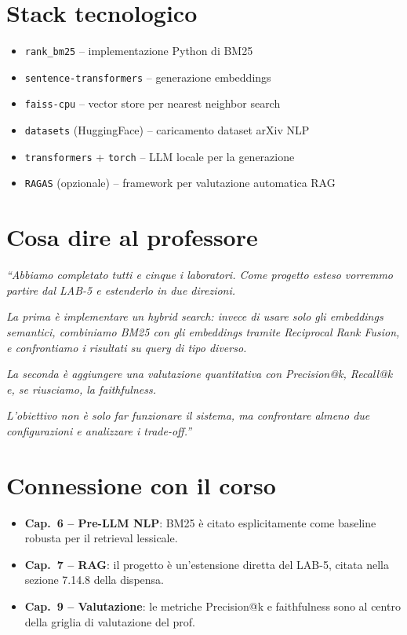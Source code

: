 \documentclass[12pt,a4paper]{article}
\begin{document}
\section{Stack tecnologico}

\begin{itemize}
  \item \texttt{rank\_bm25} -- implementazione Python di BM25
  \item \texttt{sentence-transformers} -- generazione embeddings
  \item \texttt{faiss-cpu} -- vector store per nearest neighbor search
  \item \texttt{datasets} (HuggingFace) -- caricamento dataset arXiv NLP
  \item \texttt{transformers} + \texttt{torch} -- LLM locale per la generazione
  \item \texttt{RAGAS} (opzionale) -- framework per valutazione automatica RAG
\end{itemize}

\section{Cosa dire al professore}

\textit{``Abbiamo completato tutti e cinque i laboratori. Come progetto esteso
vorremmo partire dal LAB-5 e estenderlo in due direzioni.}

\textit{La prima è implementare un hybrid search: invece di usare solo gli
embeddings semantici, combiniamo BM25 con gli embeddings tramite Reciprocal
Rank Fusion, e confrontiamo i risultati su query di tipo diverso.}

\textit{La seconda è aggiungere una valutazione quantitativa con Precision@k,
Recall@k e, se riusciamo, la faithfulness.}

\textit{L'obiettivo non è solo far funzionare il sistema, ma confrontare almeno
due configurazioni e analizzare i trade-off.''}

\section{Connessione con il corso}

\begin{itemize}
  \item \textbf{Cap.\ 6 -- Pre-LLM NLP}: BM25 è citato esplicitamente come
        baseline robusta per il retrieval lessicale.
  \item \textbf{Cap.\ 7 -- RAG}: il progetto è un'estensione diretta del LAB-5,
        citata nella sezione 7.14.8 della dispensa.
  \item \textbf{Cap.\ 9 -- Valutazione}: le metriche Precision@k e faithfulness
        sono al centro della griglia di valutazione del prof.
\end{itemize}
\end{document}
